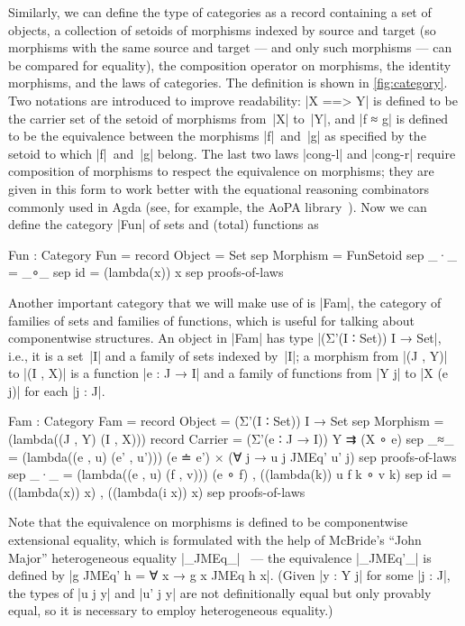 Similarly, we can define the type of categories as a record containing a set of objects, a collection of setoids of morphisms indexed by source and target (so morphisms with the same source and target --- and only such morphisms --- can be compared for equality), the composition operator on morphisms, the identity morphisms, and the laws of categories.
The definition is shown in \autoref{fig:category}.
Two notations are introduced to improve readability: |X ==> Y| is defined to be the carrier set of the setoid of morphisms from~|X| to~|Y|, and |f ≈ g| is defined to be the equivalence between the morphisms |f|~and~|g| as specified by the setoid to which |f|~and~|g| belong.
The last two laws |cong-l| and |cong-r| require composition of morphisms to respect the equivalence on morphisms; they are given in this form to work better with the equational reasoning combinators commonly used in Agda (see, for example, the AoPA library~\cite{Mu-AoPA}).
Now we can define the category |Fun| of sets and (total) functions as
\begin{code}
Fun : Category
Fun = record  {    Object    =  Set
              sep  Morphism  =  FunSetoid
              sep  _·_  =  _∘_
              sep  id   =  (lambda(x)) x
              sep  proofs-of-laws }
\end{code}
Another important category that we will make use of is |Fam|, the category of families of sets and families of functions, which is useful for talking about componentwise structures.
An object in |Fam| has type |(Σ'(I ∶ Set)) I → Set|, i.e., it is a set~|I| and a family of sets indexed by~|I|;
a morphism from |(J , Y)| to |(I , X)| is a function |e : J → I| and a family of functions from |Y j| to |X (e j)| for each |j : J|.
\begin{code}
Fam : Category
Fam = record
  {    Object    = (Σ'(I ∶ Set)) I → Set
  sep  Morphism  =
         (lambda((J , Y) (I , X))) record
           {    Carrier  =  (Σ'(e ∶ J → I)) Y ⇉ (X ∘ e)
           sep  _≈_      =  (lambda((e , u) (e' , u')))
                              (e ≐ e') × (∀ {j} → u {j} JMEq' u' {j})
           sep  proofs-of-laws }
  sep  _·_  = (lambda((e , u) (f , v))) (e ∘ f) , ((lambda({k})) u {f k} ∘ v {k})
  sep  id   =  ((lambda(x)) x) , ((lambda({i} x)) x)
  sep  proofs-of-laws }
\end{code}
Note that the equivalence on morphisms is defined to be componentwise extensional equality, which is formulated with the help of McBride's ``John Major'' heterogeneous equality |_JMEq_|~\cite{McBride-thesis} --- the equivalence |_JMEq'_| is defined by |g JMEq' h = ∀ x → g x JMEq h x|.
(Given |y : Y j| for some |j : J|, the types of |u {j} y| and |u' {j} y| are not definitionally equal but only provably equal, so it is necessary to employ heterogeneous equality.)

